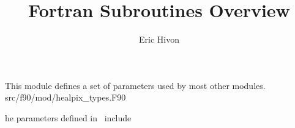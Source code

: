 
\sloppy


\title{\healpix Fortran Subroutines Overview}
 \section[healpix\_types module]{ }
\label{sub:healpix_types}
\author{Eric Hivon}

\begin{facility}
{This module defines a set of parameters used by most other
\healpix modules.}
{src/f90/mod/healpix\_types.F90}
\end{facility}


\newenvironment{mytable}[1]{%
\begin{minipage}[b]{\linewidth}{%
\renewcommand{\thefootnote}{\fnsymbol{footnote}}
\renewcommand{\footnoterule}{}
{#1}
}%
\end{minipage}
}

The parameters defined in \thedocid\ include

